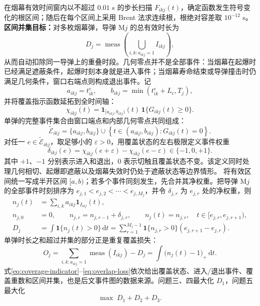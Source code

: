 \documentclass[UTF8,a4paper,12pt,fontset=windows]{ctexart}
\newcommand{\meas}{\operatorname{meas}}
\begin{document}
在烟幕有效时间窗内以不超过 $0.01$ s 的步长扫描 $F_{ikj}(t)$，确定函数发生符号变化的根区间；随后在每个区间上采用 Brent 法求连续根\cite{brent}，根绝对容差取 $10^{-12}$ s。\textbf{区间并集目标：}对多枚烟幕弹，导弹 M$j$ 的总有效时长为
\begin{equation}
D_j=\meas\left(\bigcup_{i,k:a_{ikj}=1}I_{ikj}\right),
\label{eq:union}
\end{equation}
从而自动扣除同一导弹上的重叠时段。几何零点并不是全部事件：当烟幕在起爆时已经满足遮蔽条件，起爆时刻本身就是进入事件；当烟幕寿命结束或导弹撞击时仍满足几何条件，窗口右端点则构成退出事件。记
\[
a_{ikj}=t_{ik}^e,\qquad b_{ikj}=\min(t_{ik}^e+L_c,T_j),
\]
并将覆盖指示函数延拓到全时间轴：
\begin{equation}
\chi_{ikj}(t)=
\mathbf 1_{[a_{ikj},b_{ikj})}(t)\,
\mathbf 1\{G_{ikj}(t)\geq0\}.
\label{eq:coverage-indicator}
\end{equation}
单弹的完整事件集合由窗口端点和内部几何零点共同组成：
\begin{equation}
\widetilde{\mathcal E}_{ikj}=
\{a_{ikj},b_{ikj}\}\cup
\left\{t\in(a_{ikj},b_{ikj}):G_{ikj}(t)=0\right\}.
\label{eq:event-root-set}
\end{equation}
对任一 $e\in\widetilde{\mathcal E}_{ikj}$，取足够小的 $\varepsilon>0$，用覆盖状态的左右极限定义事件权重
\begin{equation}
\delta_{ikj}(e)=
\chi_{ikj}(e+\varepsilon)-\chi_{ikj}(e-\varepsilon)
\in\{-1,0,+1\}.
\label{eq:event-weight}
\end{equation}
其中 $+1$、$-1$ 分别表示进入和退出，0 表示切触且覆盖状态不变。该定义同时处理几何相切、起爆即遮蔽以及烟幕失效时仍处于遮蔽状态等边界情形。
将有效区间统一写成半开区间 $[a,b)$；若多个事件同刻发生，先合并其净权重。把导弹 M$j$ 的全部事件时刻排序为
$e_{j,1}<e_{j,2}<\cdots<e_{j,M_j}$，并令 $\delta_{j,r}$ 为 $e_{j,r}$ 处的净权重，则
\begin{align}
n_j(t)&=\sum_{i,k}a_{ikj}\mathbf 1_{I_{ikj}}(t),\label{eq:coverage-count}\\
n_{j,0}&=0,\qquad n_{j,r}=n_{j,r-1}+\delta_{j,r},
\qquad n_j(t)=n_{j,r},\quad t\in[e_{j,r},e_{j,r+1}),\label{eq:event-count}\\
D_j&=\int \mathbf 1\{n_j(t)>0\}\,\mathrm dt
=\sum_{r=1}^{M_j-1}\mathbf 1\{n_{j,r}>0\}(e_{j,r+1}-e_{j,r}).\label{eq:event-union}
\end{align}
单弹时长之和超过并集的部分正是重复覆盖损失：
\begin{equation}
O_j=\sum_{i,k:a_{ikj}=1}\meas(I_{ikj})-D_j
=\int\bigl(n_j(t)-1\bigr)_+\,\mathrm dt.
\label{eq:overlap-loss}
\end{equation}
式\eqref{eq:coverage-indicator}--\eqref{eq:overlap-loss}依次给出覆盖状态、进入/退出事件、覆盖重数和区间并集，也是后文事件图的数据来源。问题三、四最大化 $D_1$，问题五最大化
\begin{equation}
\max\;D_1+D_2+D_3.
\label{eq:q5-objective}
\end{equation}
\end{document}
